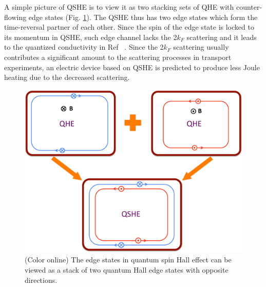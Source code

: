 A simple picture of QSHE is to view it as two stacking sets of QHE with counter-flowing edge states (Fig. \ref{QSHE}). The QSHE thus has two edge states which form the time-reversal partner of each other. Since the spin of the edge state is locked to its momentum in QSHE, such edge channel lacks the 2$k_F$ scattering and it leads to the quantized conductivity in Ref ~\cite{Konig2007}. Since the 2$k_F$ scattering usually contributes a significant amount to the scattering processes in transport experiments, an electric device based on QSHE is predicted to produce less Joule heating due to the decreased scattering. 
\begin{figure}[htb]
  \begin{center}            
\includegraphics[width=0.9\linewidth]{ch-intro/figures/QSHE.pdf} 
\caption{\label{QSHE} (Color online) 
The edge states in quantum spin Hall effect can be viewed as a stack of two quantum Hall edge states with opposite directions.
} 
  \end{center}
\end{figure}

